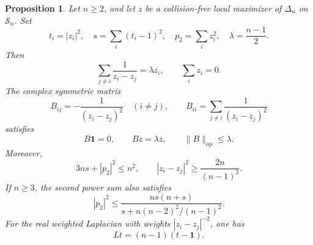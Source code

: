\documentclass[11pt]{article}
\newtheorem{proposition}[theorem]{Proposition}
\theoremstyle{remark}
\newcommand{\one}{\mathbf 1}
\newcommand{\norm}[1]{\lVert#1\rVert}
\newcommand{\op}{\mathrm{op}}
\numberwithin{equation}{section}
\begin{document}
\begin{proposition}\label{ref5-prop:general}
Let $n\ge2$, and let $z$ be a collision-free local maximizer of
$\Delta_n$ on $\mathcal S_n$. Set
\[
 t_i=|z_i|^2,\quad s=\sum_i(t_i-1)^2,\quad
 p_2=\sum_i z_i^2,\quad \lambda=\frac{n-1}{2}.
\]
Then
\begin{equation}\label{ref5-eq:stationary-general}
 \sum_{j\ne i}\frac1{z_i-z_j}=\lambda\overline{z_i},
 \qquad \sum_i z_i=0.
\end{equation}
The complex symmetric matrix
\begin{equation}\label{ref5-eq:B}
 B_{ij}=-\frac1{(z_i-z_j)^2}\quad(i\ne j),\qquad
 B_{ii}=\sum_{j\ne i}\frac1{(z_i-z_j)^2}
\end{equation}
satisfies
\begin{equation}\label{ref5-eq:B-general}
 B\one=0,\qquad Bz=\lambda\overline z,\qquad
 \norm{B}_{\op}\le\lambda.
\end{equation}
Moreover,
\begin{equation}\label{ref5-eq:radial-general}
 3ns+|p_2|^2\le n^2,\qquad
 |z_i-z_j|^2\ge\frac{2n}{(n-1)^2}.
\end{equation}
If $n\ge3$, the second power sum also satisfies
\begin{equation}\label{ref5-eq:power-radial}
 |p_2|^2\le
 \frac{ns(n+s)}{s+n(n-2)^2/(n-1)^2}.
\end{equation}
For the real weighted Laplacian with weights
$|z_i-z_j|^{-2}$, one has
\begin{equation}\label{ref5-eq:L-general}
 Lt=(n-1)(t-\one).
\end{equation}
\end{proposition}
\end{document}
